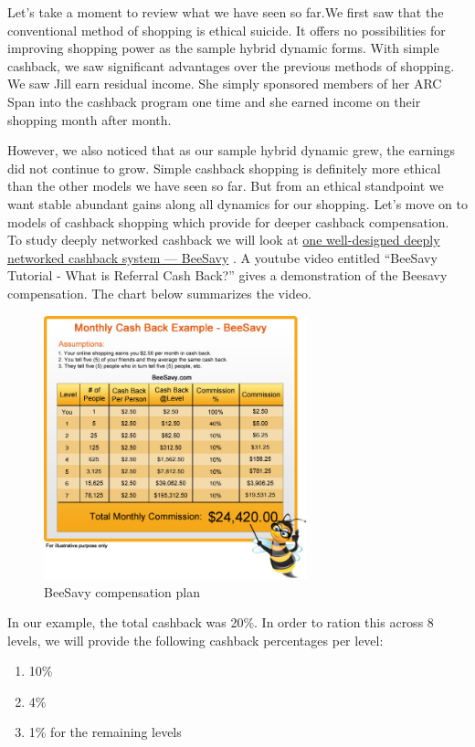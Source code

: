 \documentclass{article}%
\begin{document}
Let's take a moment to review what we have seen so far.We first saw that the conventional method of shopping is ethical suicide. It offers no possibilities for improving shopping power as the sample hybrid dynamic forms. With simple cashback, we saw significant advantages over the previous methods of shopping. 
We saw Jill earn residual income. She simply sponsored members of her ARC Span into the cashback program one time and she earned income on their shopping month after month.

However, we also noticed that as our sample hybrid dynamic grew, the earnings did not continue to grow. Simple cashback shopping is definitely more ethical than the other models we have seen so far. But from an ethical standpoint we want stable abundant gains along all dynamics for our shopping. Let's move on to models of cashback shopping which provide for deeper cashback compensation. To study deeply networked cashback we will look at \href{http://j.mp/cbk-beesavy}{one well-designed deeply networked cashback system --- BeeSavy} . A youtube video entitled ``BeeSavy Tutorial - What is Referral Cash Back?'' gives a demonstration of the Beesavy compensation. The chart below summarizes the video. 

\begin{figure}[h]
\centering
	\includegraphics[width=3in]{beesavy-table.png}
	\caption{BeeSavy compensation plan}
\end{figure}

 

In our example, the total cashback was 20\%. In order to ration this across 8 levels, we will provide the following cashback percentages per level:

\begin{enumerate}
\item   10\%
\item 4\%
\item  1\% for the remaining levels
\end{enumerate}	
\end{document}
